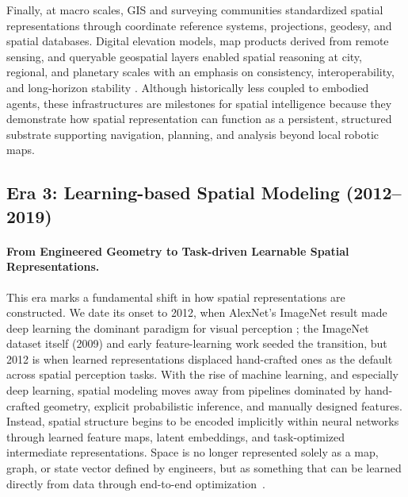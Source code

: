 Finally, at macro scales, GIS and surveying communities standardized spatial representations through coordinate reference systems, projections, geodesy, and spatial databases.
Digital elevation models, map products derived from remote sensing, and queryable geospatial layers enabled spatial reasoning at city, regional, and planetary scales with an emphasis on consistency, interoperability, and long-horizon stability \cite{goodchild1992geographical,li2025giscience}.
Although historically less coupled to embodied agents, these infrastructures are milestones for spatial intelligence because they demonstrate how spatial representation can function as a persistent, structured substrate supporting navigation, planning, and analysis beyond local robotic maps.








\subsection{Era 3: Learning-based Spatial Modeling (2012--2019)}
\label{subsec:era-learning-based}

\paragraph{From Engineered Geometry to Task-driven Learnable Spatial Representations.}
This era marks a fundamental shift in how spatial representations are constructed.
We date its onset to 2012, when AlexNet's ImageNet result made deep learning the dominant paradigm for visual perception \cite{krizhevsky2012imagenet}; the ImageNet dataset itself (2009) and early feature-learning work seeded the transition, but 2012 is when learned representations displaced hand-crafted ones as the default across spatial perception tasks.
With the rise of machine learning, and especially deep learning, spatial modeling moves away from pipelines dominated by hand-crafted geometry, explicit probabilistic inference, and manually designed features.
Instead, spatial structure begins to be encoded implicitly within neural networks through learned feature maps, latent embeddings, and task-optimized intermediate representations.
Space is no longer represented solely as a map, graph, or state vector defined by engineers, but as something that can be learned directly from data through end-to-end optimization~\cite{deng2009imagenet,eigen2014depth,mildenhall2021nerf}.




